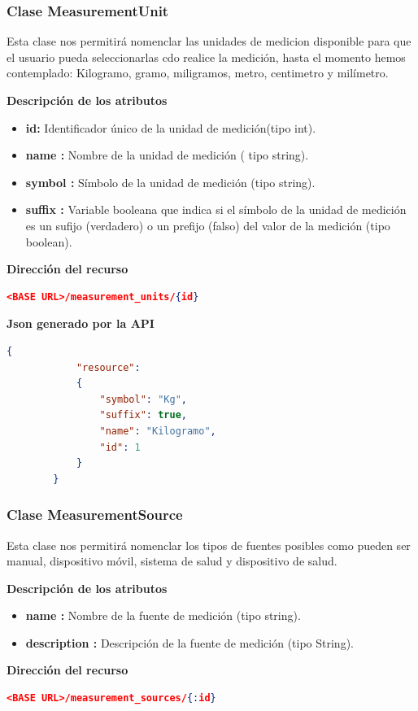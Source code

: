 \documentclass[a4paper,12pt]{article}
\begin{document}
\subsubsection{ Clase MeasurementUnit }
Esta clase nos permitirá  nomenclar  las unidades de medicion disponible para que el usuario pueda seleccionarlas cdo realice la medición, hasta el momento hemos contemplado: Kilogramo, gramo, miligramos, metro, centimetro y milímetro.

    \textbf{Descripción de los atributos}
        \begin{itemize}
            \item \textbf{id:	}	Identificador único de la unidad de medición(tipo int).
            \item \textbf{name :	}	Nombre de la unidad de medición ( tipo string).
            \item \textbf{symbol :}		Símbolo de la unidad de medición (tipo string).
            \item \textbf{suffix :}	Variable booleana que indica si el símbolo de la unidad de medición es un sufijo (verdadero) o un prefijo (falso) del valor de la medición (tipo boolean).
        \end{itemize}

    \textbf{Dirección del recurso}
        \begin{lstlisting}[language=json,firstnumber=1]
        <BASE URL>/measurement_units/{id}
        \end{lstlisting}

    \textbf{Json generado por la API} 
        \begin{lstlisting}[language=json,firstnumber=1]
        {
            "resource": 
            {
                "symbol": "Kg",
                "suffix": true,
                "name": "Kilogramo",
                "id": 1
            }
        }
        \end{lstlisting}

\subsubsection{ Clase MeasurementSource}
Esta clase nos permitirá nomenclar los tipos de fuentes posibles como pueden ser manual, dispositivo móvil, sistema de salud y dispositivo de salud.
    
	\textbf{Descripción de los atributos}
        \begin{itemize}
            \item \textbf{name 	:}	Nombre de la fuente de medición (tipo string).
            \item \textbf{description 	:}	Descripción de la fuente de medición (tipo String).
        \end{itemize}
    \textbf{Dirección del recurso}
    \begin{lstlisting}[language=json,firstnumber=1]
    <BASE URL>/measurement_sources/{:id}
    \end{lstlisting}
\end{document}
